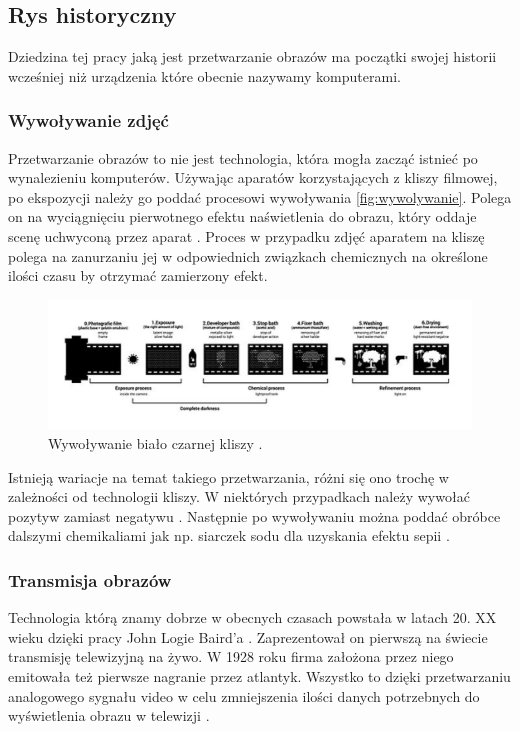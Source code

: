 \subsection{Rys historyczny}

Dziedzina tej pracy jaką jest przetwarzanie obrazów ma początki swojej historii wcześniej niż urządzenia które obecnie nazywamy komputerami.

\subsubsection{Wywoływanie zdjęć}
Przetwarzanie obrazów to nie jest technologia, która mogła zacząć istnieć po wynalezieniu komputerów. Używając aparatów korzystających z kliszy filmowej, po ekspozycji należy go poddać procesowi wywoływania \autoref{fig:wywolywanie}. 
Polega on na wyciągnięciu pierwotnego efektu naświetlenia do obrazu, który oddaje scenę uchwyconą przez aparat \cite{doi:https://doi.org/10.1002/14356007.a20_001}. Proces w przypadku zdjęć aparatem na kliszę polega na zanurzaniu jej w odpowiednich związkach chemicznych na określone ilości czasu by otrzymać zamierzony efekt. 

\begin{figure}[H]
    \centering
    \includegraphics{./images/Picture1.jpg}
    \caption{Wywoływanie biało czarnej kliszy \cite{film}.}
    \label{fig:wywolywanie}
\end{figure}


Istnieją wariacje na temat takiego przetwarzania, różni się ono trochę w zależności od technologii kliszy. W niektórych przypadkach należy wywołać pozytyw zamiast negatywu \cite{almanac}. 
Następnie po wywoływaniu można poddać obróbce dalszymi chemikaliami jak np. siarczek sodu dla uzyskania efektu sepii \cite{sepia}. 

\subsubsection{Transmisja obrazów}
Technologia którą znamy dobrze w obecnych czasach powstała w latach 20. XX wieku dzięki pracy John Logie Baird'a \cite{times1926}. 
Zaprezentował on pierwszą na świecie transmisję telewizyjną na żywo.
W 1928 roku \cite{bairdCompany} firma założona przez niego emitowała też pierwsze nagranie przez atlantyk. 
Wszystko to dzięki przetwarzaniu analogowego sygnału video w celu zmniejszenia ilości danych potrzebnych do wyświetlenia obrazu w telewizji \cite{analogVideo}.

